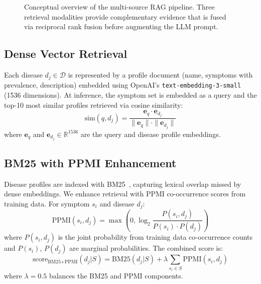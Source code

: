 \documentclass[preprint,12pt]{elsarticle}
\begin{document}
\begin{figure}[t]
\centering
{}
\caption{Conceptual overview of the multi-source RAG pipeline. Three retrieval modalities provide complementary evidence that is fused via reciprocal rank fusion before augmenting the LLM prompt.}
\label{fig:architecture}
\end{figure}

\subsection{Dense Vector Retrieval}
\label{sec:dense}

Each disease $d_j \in \mathcal{D}$ is represented by a profile document (name, symptoms with prevalence, description) embedded using OpenAI's \texttt{text-embedding-3-small} (1536 dimensions). At inference, the symptom set is embedded as a query and the top-10 most similar profiles retrieved via cosine similarity:
\begin{equation}
    \text{sim}(q, d_j) = \frac{\mathbf{e}_q \cdot \mathbf{e}_{d_j}}{\|\mathbf{e}_q\| \cdot \|\mathbf{e}_{d_j}\|}
\end{equation}
where $\mathbf{e}_q$ and $\mathbf{e}_{d_j} \in \mathbb{R}^{1536}$ are the query and disease profile embeddings.

\subsection{BM25 with PPMI Enhancement}
\label{sec:bm25}

Disease profiles are indexed with BM25~\cite{robertson2009probabilistic}, capturing lexical overlap missed by dense embeddings. We enhance retrieval with PPMI co-occurrence scores from training data. For symptom $s_i$ and disease $d_j$:
\begin{equation}
    \text{PPMI}(s_i, d_j) = \max\left(0, \log_2 \frac{P(s_i, d_j)}{P(s_i) \cdot P(d_j)}\right)
\end{equation}
where $P(s_i, d_j)$ is the joint probability from training data co-occurrence counts and $P(s_i)$, $P(d_j)$ are marginal probabilities. The combined score is:
\begin{equation}
    \text{score}_{\text{BM25+PPMI}}(d_j | S) = \text{BM25}(d_j | S) + \lambda \sum_{s_i \in S} \text{PPMI}(s_i, d_j)
\end{equation}
where $\lambda = 0.5$ balances the BM25 and PPMI components.
\end{document}
